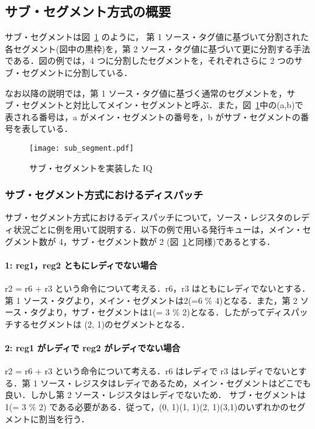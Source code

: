 \documentclass[twocolumn]{jsarticle}
\begin{document}
  \subsection{サブ・セグメント方式の概要}
  サブ・セグメントは図~\ref{fig:sub_segment} のように， 第 1 ソース・タグ値に基づいて分割された各セグメント(図中の黒枠)を，第 2 ソース・タグ値に基づいて更に分割する手法である．図の例では，4 つに分割したセグメントを，それぞれさらに 2 つのサブ・セグメントに分割している．
  
  なお以降の説明では，第 1 ソース・タグ値に基づく通常のセグメントを，サブ・セグメントと対比してメイン・セグメントと呼ぶ．また，図~\ref{fig:sub_segment}中の(a,b)で表される番号は，a がメイン・セグメントの番号を，b がサブ・セグメントの番号を表している．

  \begin{figure}[ht]
    \centering
    \texttt{[image: sub\_segment.pdf]}
    \caption{サブ・セグメントを実装した IQ}
    \label{fig:sub_segment}
  \end{figure}

  \subsubsection{サブ・セグメント方式におけるディスパッチ}
  サブ・セグメント方式におけるディスパッチについて，ソース・レジスタのレディ状況ごとに例を用いて説明する．以下の例で用いる発行キューは，メイン・セグメント数が 4，サブ・セグメント数が 2  (図~\ref{fig:sub_segment}と同様)であるとする．

  \paragraph{1: reg1，reg2 ともにレディでない場合}
  r2 = r6 + r3 という命令について考える．r6，r3 はともにレディでないとする．第 1 ソース・タグより，メイン・セグメントは2(=6 \% 4)となる．また，第 2 ソース・タグより，サブ・セグメントは1(= 3 \% 2)となる．したがってディスパッチするセグメントは (2, 1)のセグメントとなる． 
  \paragraph{2: reg1 がレディで reg2 がレディでない場合}
  r2 = r6 + r3 という命令について考える．r6 はレディで r3 はレディでないとする．第 1 ソース・レジスタはレディであるため，メイン・セグメントはどこでも良い．しかし第 2 ソース・レジスタはレディでないため． サブ・セグメントは 1(= 3 \% 2) である必要がある．従って，(0, 1)(1, 1)(2, 1)(3,1)のいずれかのセグメントに割当を行う．
\end{document}
